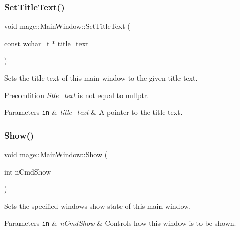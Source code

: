 \subsubsection{\texorpdfstring{Set\+Title\+Text()}{SetTitleText()}\hspace{0.1cm}{\footnotesize\ttfamily [2/2]}}
{\footnotesize\ttfamily void mage\+::\+Main\+Window\+::\+Set\+Title\+Text (\begin{DoxyParamCaption}\item[{const wchar\+\_\+t $\ast$}]{title\+\_\+text }\end{DoxyParamCaption})\hspace{0.3cm}{\ttfamily [noexcept]}}

Sets the title text of this main window to the given title text.

\begin{DoxyPrecond}{Precondition}
{\itshape title\+\_\+text} is not equal to {\ttfamily nullptr}. 
\end{DoxyPrecond}

\begin{DoxyParams}[1]{Parameters}
\mbox{\tt in}  & {\em title\+\_\+text} & A pointer to the title text. \\
\hline
\end{DoxyParams}
\hypertarget{classmage_1_1_main_window_abbb86e7f4dab1b43ca28f83e265f511e}{}\label{classmage_1_1_main_window_abbb86e7f4dab1b43ca28f83e265f511e} 
\subsubsection{\texorpdfstring{Show()}{Show()}}
{\footnotesize\ttfamily void mage\+::\+Main\+Window\+::\+Show (\begin{DoxyParamCaption}\item[{int}]{n\+Cmd\+Show }\end{DoxyParamCaption})\hspace{0.3cm}{\ttfamily [noexcept]}}

Sets the specified window\textquotesingle{}s show state of this main window.


\begin{DoxyParams}[1]{Parameters}
\mbox{\tt in}  & {\em n\+Cmd\+Show} & Controls how this window is to be shown. \\
\hline
\end{DoxyParams}
\hypertarget{classmage_1_1_main_window_a229ff4bcc198ed9caf2ce54966caf746}{}\label{classmage_1_1_main_window_a229ff4bcc198ed9caf2ce54966caf746} 
